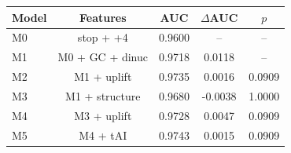 \begin{center}\small
\begin{tabular}{lcccc}\toprule
Model & Features & AUC & $\Delta$AUC & $p$ \\\midrule
M0 & stop + +4 & 0.9600 & -- & -- \\
M1 & M0 + GC + dinuc & 0.9718 & 0.0118 & -- \\
M2 & M1 + uplift & 0.9735 & 0.0016 & 0.0909 \\
M3 & M1 + structure & 0.9680 & -0.0038 & 1.0000 \\
M4 & M3 + uplift & 0.9728 & 0.0047 & 0.0909 \\
M5 & M4 + tAI & 0.9743 & 0.0015 & 0.0909 \\
\bottomrule\end{tabular}
\end{center}
